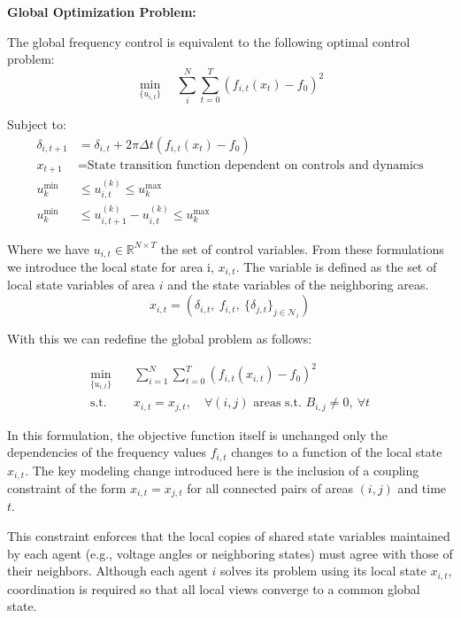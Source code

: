 \documentclass{article}
\begin{document}
\textbf{Global Optimization Problem:}

The global frequency control is equivalent to the following optimal control problem:
\begin{equation}
\min_{\{u_{i,t}\}} \quad \sum_i^N \sum_{t=0}^{T} \left( f_{i,t}(x_t) - f_0 \right)^2
\end{equation}

Subject to:
\begin{align}
    \delta_{i,t+1} &= \delta_{i,t} + 2\pi \Delta t (f_{i,t}(x_t) - f_0) \\
    x_{t+1} &= \text{State transition function dependent on controls and dynamics} \\
    u^{\min}_k &\leq u_{i,t}^{(k)} \leq u^{\max}_k \\
    u^{\min}_k &\leq u_{i,t+1}^{(k)} - u_{i,t}^{(k)} \leq u^{\max}_k
\end{align}

Where we have $u_{i,t} \in \mathbb{R}^{N \times T}$ the set of control variables. From these formulations we introduce the local state for area i, $x_{i,t}$. The variable is defined as the set of local state variables of area $i$ and the state variables of the neighboring areas.
\[
x_{i,t} = \left( \delta_{i,t},\ f_{i,t},\ \{ \delta_{j,t} \}_{j \in \mathcal{N}_i} \right)
\] 

With this we can redefine the global problem as follows:

\begin{align}
\min_{\{u_{i,t}\}} \quad & \sum_{i=1}^{N} \sum_{t=0}^{T} \left( f_{i,t}(x_{i,t}) - f_0 \right)^2 \label{eq:decentralized_obj} \\
\text{s.t.} \quad & x_{i,t} = x_{j,t}, \quad \forall (i,j) \text{ areas s.t. } B_{i,j} \neq 0,\ \forall t \label{eq:coupling_constraint}
\end{align}

In this formulation, the objective function itself is unchanged only the dependencies of the frequency values $f_{i,t}$ changes to a function of the local state $x_{i,t}$. The key modeling change introduced here is the inclusion of a coupling constraint of the form $x_{i,t} = x_{j,t}$ for all connected pairs of areas $(i,j)$ and time $t$.

This constraint enforces that the local copies of shared state variables maintained by each agent (e.g., voltage angles or neighboring states) must agree with those of their neighbors. Although each agent $i$ solves its problem using its local state $x_{i,t}$, coordination is required so that all local views converge to a common global state.
\end{document}
